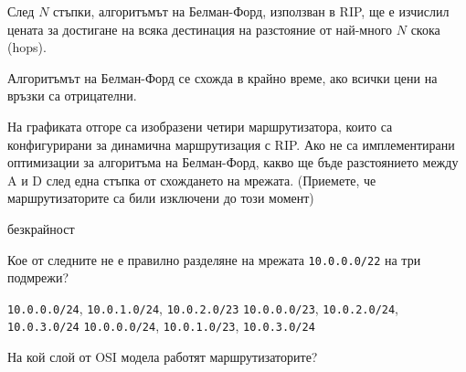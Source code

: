 \begin{questions}
\begin{choices}
    \CorrectChoice След $N$ стъпки, алгоритъмът на Белман-Форд, използван в RIP,
    ще е изчислил цената за достигане на всяка дестинация на разстояние от
    най-много $N$ скока (\foreignlanguage{english}{hops}).

    \choice Алгоритъмът на Белман-Форд се схожда в крайно време, ако всички цени
    на връзки са отрицателни.
  \end{choices}

  \begin{center}
  \end{center}

  \question[7] На графиката отгоре са изобразени четири маршрутизатора, които са
  конфигурирани за динамична маршрутизация с RIP. Ако не са имплементирани
  оптимизации за алгоритъма на Белман-Форд, какво ще бъде разстоянието между A и
  D след една стъпка от схождането на мрежата. (Приемете, че маршрутизаторите са
  били изключени до този момент)

  \begin{oneparchoices}
    \CorrectChoice безкрайност
  \end{oneparchoices}

  \question[2] Кое от следните не е правилно разделяне на мрежата
  \texttt{10.0.0.0/22} на три подмрежи?

  \begin{choices}
    \choice \texttt{10.0.0.0/24}, \texttt{10.0.1.0/24}, \texttt{10.0.2.0/23}
    \CorrectChoice \texttt{10.0.0.0/23}, \texttt{10.0.2.0/24}, \texttt{10.0.3.0/24}
    \choice \texttt{10.0.0.0/24}, \texttt{10.0.1.0/23}, \texttt{10.0.3.0/24}
  \end{choices}

  \question[6] На кой слой от OSI модела работят маршрутизаторите?
  \begin{oneparchoices}
  \end{oneparchoices}


\end{questions}
